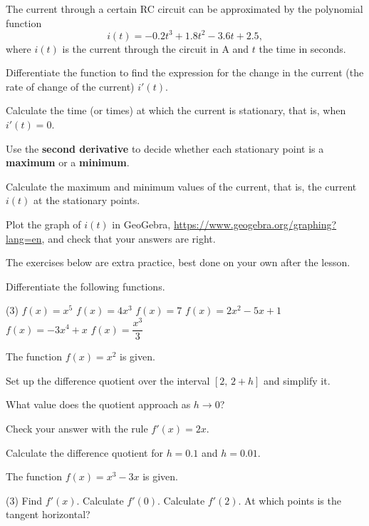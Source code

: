 The current through a certain RC circuit can be approximated by the polynomial function
\[
  i(t) = -0.2t^3 + 1.8t^2 - 3.6t + 2.5,
\]
where $i(t)$ is the current through the circuit in A and $t$ the time in seconds.
\begin{parts}
  \item Differentiate the function to find the expression for the change in the current (the
    rate of change of the current) $i'(t)$.
  \item Calculate the time (or times) at which the current is stationary, that is, when
    $i'(t) = 0$.
  \item Use the \textbf{second derivative} to decide whether each stationary point is a
    \textbf{maximum} or a \textbf{minimum}.
  \item Calculate the maximum and minimum values of the current, that is, the current $i(t)$ at
    the stationary points.
  \item Plot the graph of $i(t)$ in GeoGebra, \url{https://www.geogebra.org/graphing?lang=en}, and
    check that your answers are right.
\end{parts}

The exercises below are extra practice, best done on your own after the lesson.

Differentiate the following functions.
\begin{delar}(3)
  \task $f(x) = x^5$
  \task $f(x) = 4x^3$
  \task $f(x) = 7$
  \task $f(x) = 2x^2 - 5x + 1$
  \task $f(x) = -3x^4 + x$
  \task $f(x) = \dfrac{x^3}{3}$
\end{delar}

The function $f(x) = x^2$ is given.
\begin{parts}
  \item Set up the difference quotient over the interval $[2,\, 2 + h]$ and simplify it.
  \item What value does the quotient approach as $h \to 0$?
  \item Check your answer with the rule $f'(x) = 2x$.
  \item Calculate the difference quotient for $h = 0.1$ and $h = 0.01$.
\end{parts}

The function $f(x) = x^3 - 3x$ is given.
\begin{delar}(3)
  \task Find $f'(x)$.
  \task Calculate $f'(0)$.
  \task Calculate $f'(2)$.
  \task* At which points is the tangent horizontal?
\end{delar}

